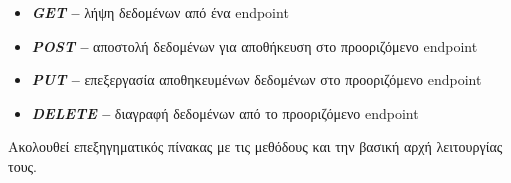 \begin{itemize}
    \item {}\textbf{\textit{GET} --}  λήψη δεδομένων από ένα endpoint
    \item {}\textbf{\textit{POST} --} αποστολή δεδομένων για αποθήκευση στο προοριζόμενο endpoint
    \item {}\textbf{\textit{PUT} --} επεξεργασία αποθηκευμένων δεδομένων στο προοριζόμενο endpoint
     \item {}\textbf{\textit{DELETE} --} διαγραφή δεδομένων από το προοριζόμενο endpoint
\end{itemize}

Ακολουθεί επεξηγηματικός πίνακας με τις μεθόδους και την βασική αρχή λειτουργίας τους.

